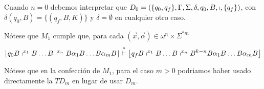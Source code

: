 \begin{frame}
  \begin{block}{}
    \PN Cuando $n=0$ debemos interpretar que $D_{0} = \left(\{q_{0},q_{f}\}, \Gamma, \Sigma, \delta, q_{0}, B,
    \shortmid, \{q_{f}\}\right)$, con $\delta(q_{0},B) = \{(q_{f},B,K)\}$ y $\delta = \emptyset$ en cualquier otro caso.

    \vspace{3mm}
    \PN Nótese que $M_{1}$ cumple que, para cada $(\vec{x},\vec{\alpha}) \in \omega^{n} \times \Sigma^{\ast m}$
    \sizeOfLetterSecond
    \begin{equation*}
      \left\lfloor q_{0} B \shortmid^{x_{1}} B \dotsc B \shortmid^{x_{n}} B \alpha_{1} B \dotsc B \alpha_{m} B
      \right\rfloor \overset{\ast}{\vdash} \left\lfloor q_{f} B \shortmid^{x_{1}} B \dotsc B \shortmid^{x_{n}} B^{k-n}B
      \alpha_{1} B \dotsc B \alpha_{m} B \right\rfloor
    \end{equation*}

    \vspace{3mm}
    \sizeOfLetterThird
    \PN Nótese que en la confección de $M_{1}$, para el caso $m>0$ podriamos haber usado directamente la $TD_{m}$ en
    lugar de usar $D_{m}$.
  \end{block}
\end{frame}
